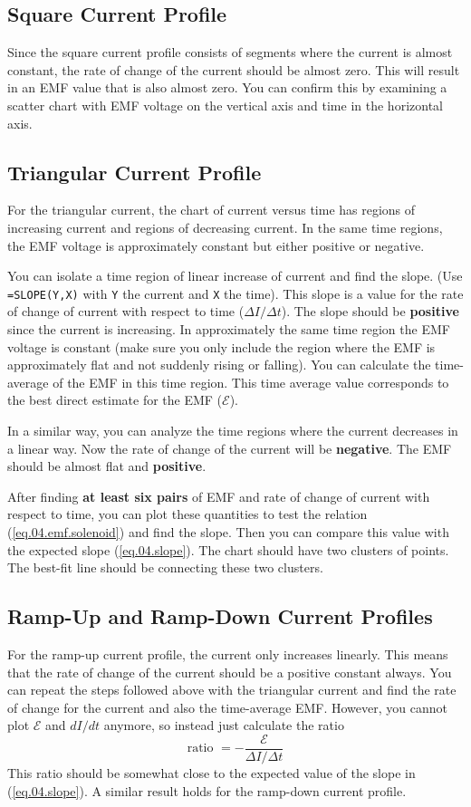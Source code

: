 \subsection{Square Current Profile}
%
Since the square current profile consists of segments where the current is almost constant, the rate of change of the current should be almost zero. This will result in an EMF value that is also almost zero. You can confirm this by examining a scatter chart with EMF voltage on the vertical axis and time in the horizontal axis.
%
\subsection{Triangular Current Profile}
%
For the triangular current, the chart of current versus time has regions of increasing current and regions of decreasing current. In the same time regions, the EMF voltage is approximately constant but either positive or negative.

You can isolate a time region of linear increase of current and find the slope. (Use \texttt{=SLOPE(Y,X)} with \texttt{Y} the current and \texttt{X} the time). This slope is a value for the rate of change of current with respect to time ($\Delta I / \Delta t$). The slope should be \textbf{positive} since the current is increasing. In approximately the same time region the EMF voltage is constant (make sure you only include the region where the EMF is approximately flat and not suddenly rising or falling). You can calculate the time-average of the EMF in this time region. This time average value corresponds to the best direct estimate for the EMF ($\mathcal{E}$).

In a similar way, you can analyze the time regions where the current decreases in a linear way. Now the rate of change of the current will be \textbf{negative}. The EMF should be almost flat and \textbf{positive}.

After finding \textbf{at least six pairs} of EMF and rate of change of current with respect to time, you can plot these quantities to test the relation (\ref{eq.04.emf.solenoid}) and find the slope. Then you can compare this value with the expected slope (\ref{eq.04.slope}). The chart should have two clusters of points. The best-fit line should be connecting these two clusters.
%
\subsection{Ramp-Up and Ramp-Down Current Profiles}
%
For the ramp-up current profile, the current only increases linearly. This means that the rate of change of the current should be a positive constant always. You can repeat the steps followed above with the triangular current and find the rate of change for the current and also the time-average EMF. However, you cannot plot $\mathcal{E}$ and $dI/dt$ anymore, so instead just calculate the ratio
\begin{equation}
	\text{ratio } = -\frac{\mathcal{E}}{\Delta I/\Delta t}
	\label{eq.04.ratio}
\end{equation}
This ratio should be somewhat close to the expected value of the slope in (\ref{eq.04.slope}). A similar result holds for the ramp-down current profile.
%
